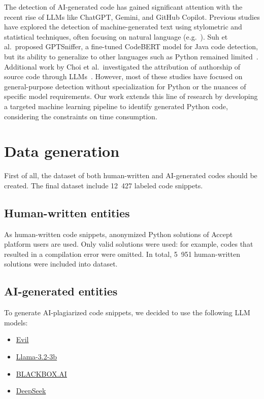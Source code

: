 \documentclass{article}
\begin{document}
The detection of AI-generated code has gained significant attention with the recent rise of LLMs like ChatGPT, Gemini, and GitHub Copilot. Previous studies have explored the detection of machine-generated text using stylometric and statistical techniques, often focusing on natural language (e.g.~\cite{Su2020}). Suh et al.\ proposed GPTSniffer, a fine-tuned CodeBERT model for Java code detection, but its ability to generalize to other languages such as Python remained limited~\cite{Suh24}. Additional work by Choi et al.\ investigated the attribution of authorship of source code through LLMs~\cite{Choi2025}. However, most of these studies have focused on general-purpose detection without specialization for Python or the nuances of specific model requirements. Our work extends this line of research by developing a targeted machine learning pipeline to identify generated Python code, considering the constraints on time consumption.

\section{Data generation}

First of all, the dataset of both human-written and AI-generated codes should be created. The final dataset include 12~427 labeled code snippets.

\subsection{Human-written entities}

As human-written code snippets, anonymized Python solutions of Accept~\cite{Beresnev} platform users are used. Only valid solutions were used: for example, codes that resulted in a compilation error were omitted. In total, 5~951 human-written solutions were included into dataset.

\subsection{AI-generated entities}

To generate AI-plagiarized code snippets, we decided to use the following LLM models:
\begin{itemize}
  \item \href{https://huggingface.co/DavidAU/L3.1-Evil-Reasoning-Dark-Planet-Hermes-R1-Uncensored-8B?not-for-all-audiences=true}{Evil}
  \item \href{https://huggingface.co/meta-llama/Llama-3.2-3B}{Llama-3.2-3b}
  \item \href{https://www.blackbox.ai/}{BLACKBOX.AI}
  \item \href{https://chat.deepseek.com/}{DeepSeek}
\end{itemize}
\end{document}
